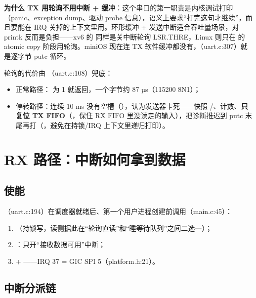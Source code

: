\textbf{为什么 TX 用轮询不用中断 + 缓冲}：这个串口的第一职责是内核调试打印（panic、exception dump、驱动 probe 信息），语义上要求``打完这句才继续''，而且要能在 IRQ 关掉的上下文里用。环形缓冲 + 发送中断适合吞吐量场景，对 printk 反而是负担——xv6 的  同样是关中断轮询 LSR.THRE，Linux 则只在  的 atomic copy 阶段用轮询。miniOS 现在连 TX 软件缓冲都没有，（uart.c:307）就是逐字节 putc 循环。

轮询的代价由 （uart.c:108）兜底：

\begin{itemize}
  \item 正常路径： 为 1 就返回，一个字节约 87 µs（115200 8N1）；
  \item 停转路径：连续 10 ms 没有空槽（），认为发送器卡死——快照 /、计数、\textbf{只复位 TX FIFO}（，保住 RX FIFO 里没读走的输入），把诊断推迟到 putc 末尾再打（，避免在持锁/IRQ 上下文里递归打印）。
\end{itemize}

\section{RX 路径：中断如何拿到数据}

\subsection{使能}

（uart.c:194）在调度器就绪后、第一个用户进程创建前调用（main.c:45）：

\begin{enumerate}
  \item {}（持锁写，读侧据此在``轮询直读''和``睡等待队列''之间二选一）；
  \item {}：只开``接收数据可用''中断；
  \item {} + ——IRQ 37 = GIC SPI 5（platform.h:21）。
\end{enumerate}

\subsection{中断分派链}


